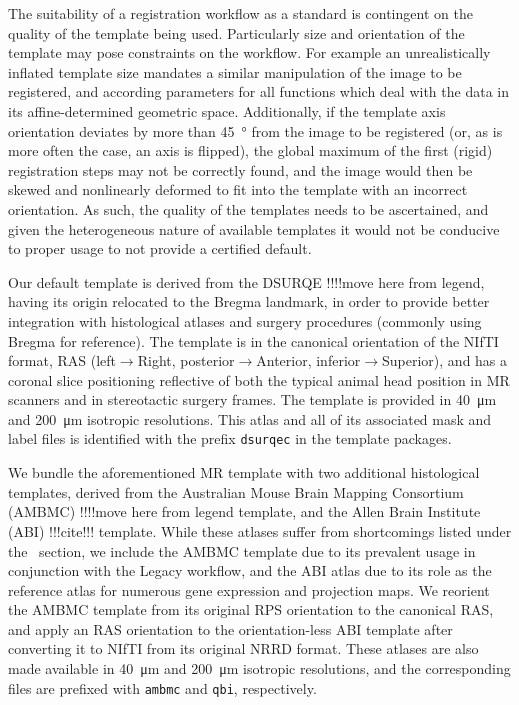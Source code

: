 The suitability of a registration workflow as a standard is contingent on the quality of the template being used.
Particularly size and orientation of the template may pose constraints on the workflow.
For example an unrealistically inflated template size mandates a similar manipulation of the image to be registered, and according parameters for all functions which deal with the data in its affine-determined geometric space.
Additionally, if the template axis orientation deviates by more than \SI{45}{\degree} from the image to be registered (or, as is more often the case, an axis is flipped), the global maximum of the first (rigid) registration steps may not be correctly found, and the image would then be skewed and nonlinearly deformed to fit into the template with an incorrect orientation.
As such, the quality of the templates needs to be ascertained, and given the heterogeneous nature of available templates it would not be conducive to proper usage to not provide a certified default.

Our default template is derived from the DSURQE\cite{dsu} !!!!move here from legend, having its origin relocated to the Bregma landmark, in order to provide better integration with histological atlases and surgery procedures (commonly using Bregma for reference).
The template is in the canonical orientation of the NIfTI format, RAS (left$\rightarrow$Right, posterior$\rightarrow$Anterior, inferior$\rightarrow$Superior), and has a coronal slice positioning reflective of both the typical animal head position in MR scanners and in stereotactic surgery frames.
The template is provided in \SI{40}{\micro\meter} and \SI{200}{\micro\meter} isotropic resolutions.
This atlas and all of its associated mask and label files is identified with the prefix \textcolor{mg}{\texttt{dsurqec}} in the template packages.

We bundle the aforementioned MR template with two additional histological templates, derived from the Australian Mouse Brain Mapping Consortium (AMBMC) \cite{amb} !!!!move here from legend template, and the Allen Brain Institute (ABI) !!!cite!!! template.
While these atlases suffer from shortcomings listed under the ~section, we include the AMBMC template due to its prevalent usage in conjunction with the Legacy workflow, and the ABI atlas due to its role as the reference atlas for numerous gene expression and projection maps.
We reorient the AMBMC template from its original RPS orientation to the canonical RAS, and apply an RAS orientation to the orientation-less ABI template after converting it to NIfTI from its original NRRD format.
These atlases are also made available in \SI{40}{\micro\meter} and \SI{200}{\micro\meter} isotropic resolutions, and the corresponding files are prefixed with \textcolor{mg}{\texttt{ambmc}} and \textcolor{mg}{\texttt{qbi}}, respectively.

